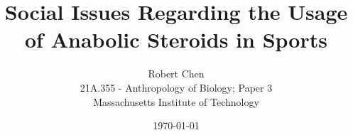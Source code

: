 


\title{Social Issues Regarding the Usage of Anabolic Steroids in Sports}

\author{
\vspace{0.5in}
Robert Chen\\
21A.355 - Anthropology of Biology; Paper 3\\
Massachusetts Institute of Technology
\vspace{1in}
}


\date{
\today
}

